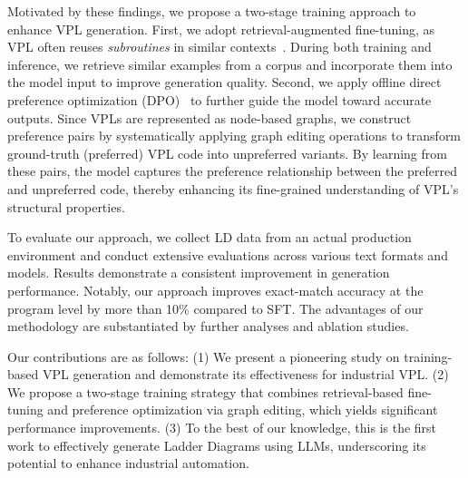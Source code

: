 Motivated by these findings, we propose a two-stage training approach to enhance VPL generation. First, we adopt retrieval-augmented fine-tuning, as VPL often reuses \textit{subroutines} in similar contexts~\cite{Terra_Neves_2021}. During both training and inference, we retrieve similar examples from a corpus and incorporate them into the model input to improve generation quality. Second, we apply offline direct preference optimization (DPO)~\cite{rafailov2023direct} to further guide the model toward accurate outputs.
Since VPLs are represented as node-based graphs, we construct preference pairs by systematically applying graph editing operations to transform ground-truth (preferred) VPL code into unpreferred variants. By learning from these pairs, the model captures the preference relationship between the preferred and unpreferred code, thereby enhancing its fine-grained understanding of VPL's structural properties.


To evaluate our approach, we collect LD data from an actual production environment and conduct extensive evaluations across various text formats and models. Results demonstrate a consistent improvement in generation performance. Notably, our approach improves exact-match accuracy at the program level by more than 10\% compared to SFT. The advantages of our methodology are substantiated by further analyses and ablation studies.

Our contributions are as follows:
(1) We present a pioneering study on training-based VPL generation and demonstrate its effectiveness for industrial VPL.
(2) We propose a two-stage training strategy that combines retrieval-based fine-tuning and preference optimization via graph editing, which yields significant performance improvements.
(3) To the best of our knowledge, this is the first work to effectively generate Ladder Diagrams using LLMs, underscoring its potential to enhance industrial automation.